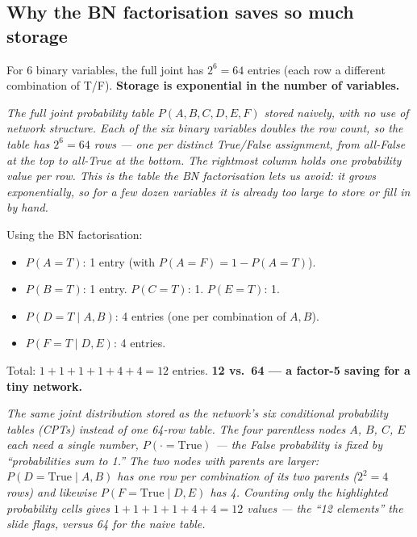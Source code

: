 \documentclass[11pt, a4paper]{article}
\begin{document}
\subsection{Why the BN factorisation saves so much storage}

For 6 binary variables, the full joint has $2^6 = 64$ entries (each row a different combination of T/F). \textbf{Storage is exponential in the number of variables.}

\begin{center}

\footnotesize\textit{The full joint probability table $P(A,B,C,D,E,F)$ stored naively, with no use of network structure. Each of the six binary variables doubles the row count, so the table has $2^6 = 64$ rows --- one per distinct True/False assignment, from all-False at the top to all-True at the bottom. The rightmost column holds one probability value per row. This is the table the BN factorisation lets us avoid: it grows exponentially, so for a few dozen variables it is already too large to store or fill in by hand.}
\end{center}

Using the BN factorisation:
\begin{itemize}
  \item $P(A=T)$: 1 entry (with $P(A=F) = 1 - P(A=T)$).
  \item $P(B=T)$: 1 entry. $P(C=T)$: 1. $P(E=T)$: 1.
  \item $P(D=T \mid A, B)$: 4 entries (one per combination of $A, B$).
  \item $P(F=T \mid D, E)$: 4 entries.
\end{itemize}
Total: $1 + 1 + 1 + 1 + 4 + 4 = 12$ entries. \textbf{12 vs.\ 64 — a factor-5 saving for a tiny network.}

\begin{center}

\footnotesize\textit{The same joint distribution stored as the network's six conditional probability tables (CPTs) instead of one 64-row table. The four parentless nodes $A$, $B$, $C$, $E$ each need a single number, $P(\cdot = \text{True})$ --- the False probability is fixed by ``probabilities sum to 1.'' The two nodes with parents are larger: $P(D = \text{True} \mid A, B)$ has one row per combination of its two parents ($2^2 = 4$ rows) and likewise $P(F = \text{True} \mid D, E)$ has 4. Counting only the highlighted probability cells gives $1+1+1+1+4+4 = 12$ values --- the ``12 elements'' the slide flags, versus 64 for the naive table.}
\end{center}
\end{document}
